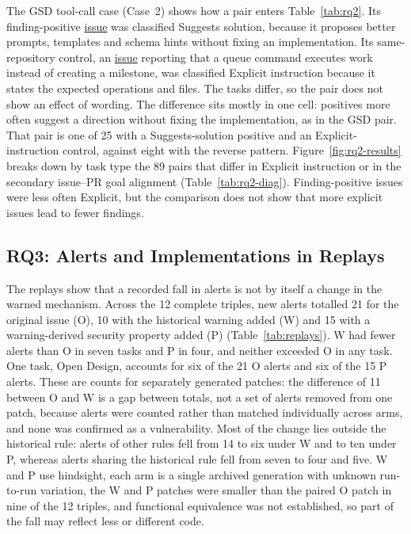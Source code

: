\documentclass[acmsmall,screen,nonacm]{acmart}
\begin{document}
The GSD tool-call case (Case~2) shows how a pair enters Table~\ref{tab:rq2}. Its finding-positive \href{https://github.com/gsd-build/gsd-2/issues/2660}{issue} was classified Suggests solution, because it proposes better prompts, templates and schema hints without fixing an implementation. Its same-repository control, an \href{https://github.com/gsd-build/gsd-2/issues/2545}{issue} reporting that a queue command executes work instead of creating a milestone, was classified Explicit instruction because it states the expected operations and files. The tasks differ, so the pair does not show an effect of wording. The difference sits mostly in one cell: positives more often suggest a direction without fixing the implementation, as in the GSD pair. That pair is one of 25 with a Suggests-solution positive and an Explicit-instruction control, against eight with the reverse pattern. Figure~\ref{fig:rq2-results} breaks down by task type the 89 pairs that differ in Explicit instruction or in the secondary issue--PR goal alignment (Table~\ref{tab:rq2-diag}). Finding-positive issues were less often Explicit, but the comparison does not show that more explicit issues lead to fewer findings.

\subsection{RQ3: Alerts and Implementations in Replays}\label{sec:rq3-res}



The replays show that a recorded fall in alerts is not by itself a change in the warned mechanism. Across the 12 complete triples, new alerts totalled 21 for the original issue (O), 10 with the historical warning added (W) and 15 with a warning-derived security property added (P) (Table~\ref{tab:replays}). W had fewer alerts than O in seven tasks and P in four, and neither exceeded O in any task. One task, Open Design, accounts for six of the 21 O alerts and six of the 15 P alerts. These are counts for separately generated patches: the difference of 11 between O and W is a gap between totals, not a set of alerts removed from one patch, because alerts were counted rather than matched individually across arms, and none was confirmed as a vulnerability. Most of the change lies outside the historical rule: alerts of other rules fell from 14 to six under W and to ten under P, whereas alerts sharing the historical rule fell from seven to four and five. W and P use hindsight, each arm is a single archived generation with unknown run-to-run variation, the W and P patches were smaller than the paired O patch in nine of the 12 triples, and functional equivalence was not established, so part of the fall may reflect less or different code.
\end{document}
